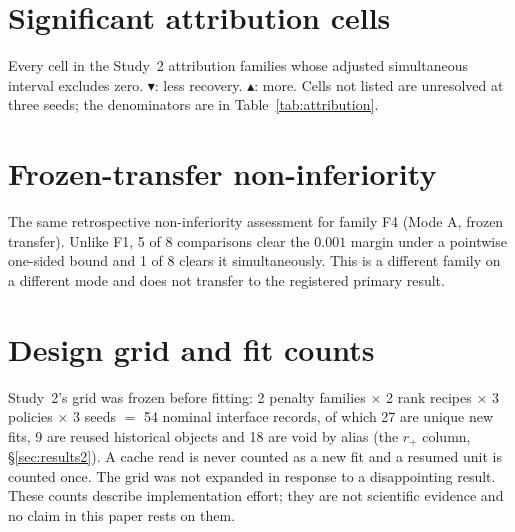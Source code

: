\documentclass[10pt]{article}
\begin{document}
\appendix
\clearpage

\section{Significant attribution cells}
\label{app:cells}
\noindent Every cell in the Study~2 attribution families whose adjusted simultaneous interval
excludes zero. $\blacktriangledown$: less recovery. $\blacktriangle$: more. Cells not listed are
unresolved at three seeds; the denominators are in Table~\ref{tab:attribution}.

\begin{center}\scriptsize

\end{center}

\section{Frozen-transfer non-inferiority}
\label{app:equiv}
\noindent The same retrospective non-inferiority assessment for family F4 (Mode A, frozen
transfer). Unlike F1, 5 of 8 comparisons clear the $0.001$ margin under a pointwise one-sided bound
and 1 of 8 clears it simultaneously. This is a different family on a different mode and does not
transfer to the registered primary result.

\begin{center}\small

\end{center}

\section{Design grid and fit counts}
\label{app:grid}

Study~2's grid was frozen before fitting: 2 penalty families $\times$ 2 rank recipes $\times$ 3
policies $\times$ 3 seeds $=$ 54 nominal interface records, of which 27 are unique new fits, 9 are
reused historical objects and 18 are void by alias (the $r_+$ column, \S\ref{sec:results2}). A cache
read is never counted as a new fit and a resumed unit is counted once. The grid was not expanded in
response to a disappointing result. These counts describe implementation effort; they are not
scientific evidence and no claim in this paper rests on them.


\end{document}
